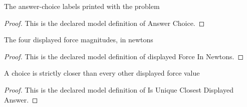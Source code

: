 \begin{definition}
  \label{def:physics:phyx-mini-0808:phyxminiproblems-problemphyxmini0808-answerchoice}
  The answer-choice labels printed with the problem
\end{definition}
\begin{proof}
  This is the declared model definition of Answer Choice.
\end{proof}
\begin{definition}
  \label{def:physics:phyx-mini-0808:phyxminiproblems-problemphyxmini0808-displayedforceinnewtons}
  The four displayed force magnitudes, in newtons
\end{definition}
\begin{proof}
  This is the declared model definition of displayed Force In Newtons.
\end{proof}
\begin{definition}
  \label{def:physics:phyx-mini-0808:phyxminiproblems-problemphyxmini0808-isuniqueclosestdisplayedanswer}
  A choice is strictly closer than every other displayed force value
\end{definition}
\begin{proof}
  This is the declared model definition of Is Unique Closest Displayed Answer.
\end{proof}
